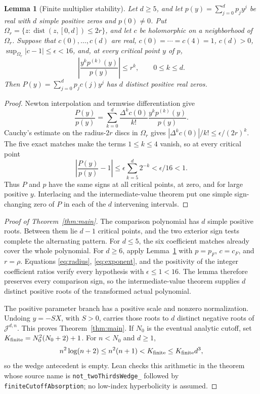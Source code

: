\documentclass[11pt]{article}
\newtheorem{lemma}[theorem]{Lemma}
\theoremstyle{definition}
\theoremstyle{remark}
\newcommand{\J}{\mathcal J}
\begin{document}
\begin{lemma}[Finite multiplier stability]\label{lem:stability}
Let $d\ge5$, and let $p(y)=\sum_{j=0}^dp_jy^j$ be real with $d$ simple
positive zeros and $p(0)\ne0$.  Put
$\Omega_r=\{z:\operatorname{dist}(z,[0,d])\le2r\}$, and let $c$ be
holomorphic on a neighborhood of $\Omega_r$.  Suppose that
$c(0),\ldots,c(d)$ are real,
$c(0)=\cdots=c(4)=1$, $c(d)>0$,
$\sup_{\Omega_r}|c-1|\le\epsilon<16$, and, at every critical point $y$ of
$p$,
\[
 \left|\frac{y^kp^{(k)}(y)}{p(y)}\right|\le r^k,
 \qquad0\le k\le d.
\]
Then $P(y)=\sum_{j=0}^dp_jc(j)y^j$ has $d$ distinct positive real zeros.
\end{lemma}

\begin{proof}
Newton interpolation and termwise differentiation give
\[
 \frac{P(y)}{p(y)}
 =\sum_{k=0}^d\frac{\Delta^kc(0)}{k!}
   \frac{y^kp^{(k)}(y)}{p(y)}.
\]
Cauchy's estimate on the radius-$2r$ discs in $\Omega_r$ gives
$|\Delta^kc(0)|/k!\le\epsilon/(2r)^k$.  The five exact matches make the
terms $1\le k\le4$ vanish, so at every critical point
\[
 \left|\frac{P(y)}{p(y)}-1\right|
 \le\epsilon\sum_{k=5}^d2^{-k}<\epsilon/16<1.
\]
Thus $P$ and $p$ have the same signs at all critical points, at zero, and
for large positive $y$.  Interlacing and the intermediate-value theorem put
one simple sign-changing zero of $P$ in each of the $d$ intervening
intervals.
\end{proof}

\begin{proof}[Proof of Theorem~\ref{thm:main}]
The comparison polynomial has $d$ simple positive roots.  Between them lie
$d-1$ critical points, and the two exterior sign tests complete the
alternating pattern.  For $d\le5$, the six coefficient matches already cover
the whole polynomial.  For $d\ge6$, apply Lemma~\ref{lem:stability} with
$p=p_F$, $c=c_F$, and $r=\rho$.  Equations \eqref{eq:radius},
\eqref{eq:exponent}, and the positivity of the integer coefficient ratios
verify every hypothesis with $\epsilon\le1<16$.  The lemma therefore
preserves every comparison sign, so the
intermediate-value theorem supplies $d$ distinct positive roots of the
transformed actual polynomial.

The positive parameter branch has a positive scale and nonzero
normalization.  Undoing $y=-SX$, with $S>0$, carries those roots to $d$
distinct negative roots of $\J^{d,n}$.  This proves
Theorem~\ref{thm:main}.  If $N_0$ is the eventual analytic cutoff, set
$K_{\rm finite}=N_0^2(N_0+2)+1$.  For $n<N_0$ and $d\ge1$,
\[
 n^2\log(n+2)\le n^2(n+1)<K_{\rm finite}\le K_{\rm finite}d^3,
\]
so the wedge antecedent is empty.  Lean checks this arithmetic in the theorem
whose source name is \texttt{not\_twoThirdsWedge\_} followed by
\texttt{finiteCutoffAbsorption}; no low-index hyperbolicity is assumed.
\end{proof}
\end{document}
